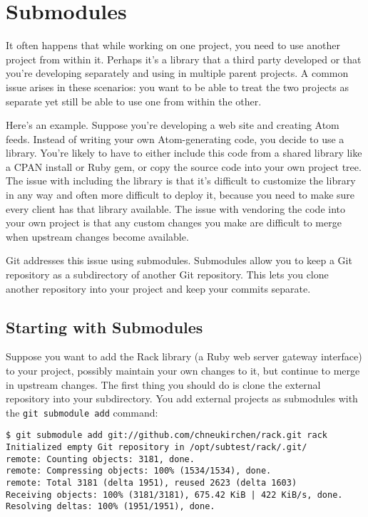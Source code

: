 \documentclass[a4paper]{book}
\begin{document}
\section{Submodules}

It often happens that while working on one project, you need to use another project from within it. Perhaps it's a library that a third party developed or that you're developing separately and using in multiple parent projects. A common issue arises in these scenarios: you want to be able to treat the two projects as separate yet still be able to use one from within the other.

Here's an example. Suppose you're developing a web site and creating Atom feeds. Instead of writing your own Atom-generating code, you decide to use a library. You're likely to have to either include this code from a shared library like a CPAN install or Ruby gem, or copy the source code into your own project tree. The issue with including the library is that it's difficult to customize the library in any way and often more difficult to deploy it, because you need to make sure every client has that library available. The issue with vendoring the code into your own project is that any custom changes you make are difficult to merge when upstream changes become available.

Git addresses this issue using submodules. Submodules allow you to keep a Git repository as a subdirectory of another Git repository. This lets you clone another repository into your project and keep your commits separate.

\subsection{Starting with Submodules}

Suppose you want to add the Rack library (a Ruby web server gateway interface) to your project, possibly maintain your own changes to it, but continue to merge in upstream changes. The first thing you should do is clone the external repository into your subdirectory. You add external projects as submodules with the \texttt{git submodule add} command:

\begin{shaded}\begin{verbatim}
$ git submodule add git://github.com/chneukirchen/rack.git rack
Initialized empty Git repository in /opt/subtest/rack/.git/
remote: Counting objects: 3181, done.
remote: Compressing objects: 100% (1534/1534), done.
remote: Total 3181 (delta 1951), reused 2623 (delta 1603)
Receiving objects: 100% (3181/3181), 675.42 KiB | 422 KiB/s, done.
Resolving deltas: 100% (1951/1951), done.
\end{verbatim}\end{shaded}
\end{document}

